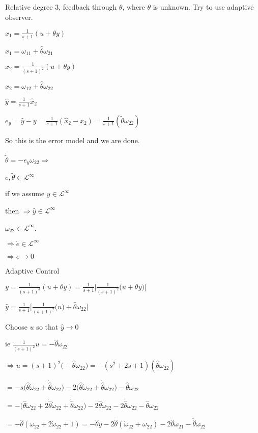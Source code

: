 Relative degree 3, feedback through $\theta$, where $\theta$ is unknown.
Try to use adaptive observer.

$x_{1}=\frac{1}{s+1}(u+\theta y)$

$\hat{x}_{1}=\omega_{11}+\hat{\theta}\omega_{21}$

$x_{2}=\frac{1}{(s+1)^{2}}(u+\theta y)$

$\hat{x}_{2}=\omega_{12}+\hat{\theta}\omega_{22}$

$\hat{y}=\frac{1}{s+1}\hat{x}_{2}$

$e_{y}=\hat{y}-y=\frac{1}{s+1}(\hat{x}_{2}-x_{2})=\frac{1}{s+1}(\tilde{\theta}\omega_{22})$

So this is the error model and we are done.

$\dot{\tilde{\theta}}=-e_{y}\omega_{22}\Rightarrow$

$e,\tilde{\theta}\in\mathcal{L}^{\infty}$

if we assume $y\in\mathcal{L}^{\infty}$

then $\Rightarrow \hat{y}\in\mathcal{L}^{\infty}$

$\omega_{22}\in\mathcal{L}^{\infty}$.

$\Rightarrow\dot{e}\in\mathcal{L}^{\infty}$

$\Rightarrow e\rightarrow0$

Adaptive Control

$y=\frac{1}{(s+1)^{3}}(u+\theta y)=\frac{1}{s+1}\biggr[\frac{1}{(s+1)^{2}}\bigr(u+\theta y\bigr)\biggr]$

$\hat{y}=\frac{1}{s+1}\biggr[\frac{1}{(s+1)^{2}}\bigr(u\bigr)+\hat{\theta}\omega_{22}\biggr]$

Choose $u$ so that $\hat{y}\rightarrow0$

ie $\frac{1}{(s+1)^{2}}u=-\hat{\theta}\omega_{22}$

$\Rightarrow u=(s+1)^{2}\bigr(-\hat{\theta}\omega_{22}\bigr)=-(s^{2}+2s+1)(\hat{\theta}\omega_{22})$

$=-s\bigr(\hat{\theta}\dot{\omega}_{22}+\dot{\hat{\theta}}\omega_{22}\bigr)-2\bigr(\hat{\theta}\dot{\omega}_{22}+\dot{\hat{\theta}}\omega_{22}\bigr)-\hat{\theta}\omega_{22}$

$=-\bigr(\hat{\theta}\ddot{\omega}_{22}+2\dot{\hat{\theta}}\dot{\omega}_{22}+\dot{\hat{\theta}}\omega_{22}\bigr)-2\hat{\theta}\dot{\omega}_{22}-2\dot{\hat{\theta}}\omega_{22}-\hat{\theta}\omega_{22}$

$=-\hat{\theta}(\ddot{\omega}_{22}+2\dot{\omega}_{22}+1)=-\hat{\theta}y-2\dot{\hat{\theta}}(\dot{\omega}_{22}+\omega_{22})-2\dot{\hat{\theta}}\omega_{21}-\ddot{\hat{\theta}}\omega_{22}$

